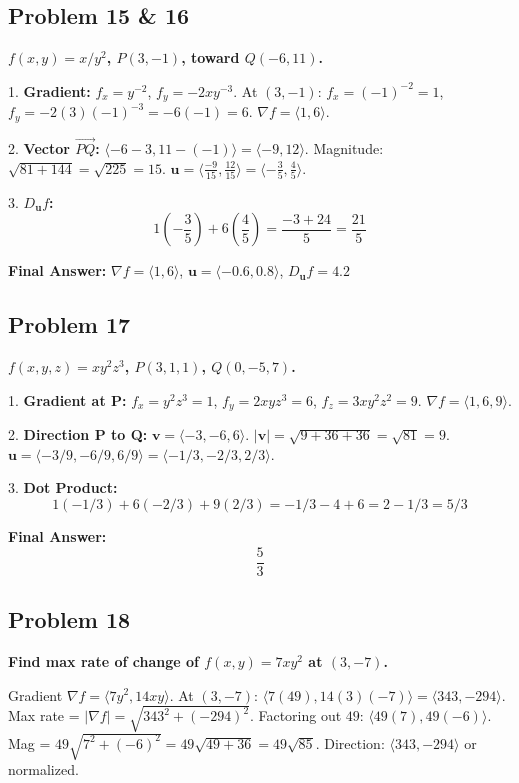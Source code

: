 \documentclass{article}
\begin{document}
\subsection*{Problem 15 \& 16}
\textbf{$f(x, y) = x/y^2$, $P(3, -1)$, toward $Q(-6, 11)$.}

1. \textbf{Gradient:} $f_x = y^{-2}$, $f_y = -2xy^{-3}$.
   At $(3, -1)$: $f_x = (-1)^{-2} = 1$, $f_y = -2(3)(-1)^{-3} = -6(-1) = 6$.
   $\nabla f = \langle 1, 6 \rangle$.

2. \textbf{Vector $\vec{PQ}$:} $\langle -6-3, 11-(-1) \rangle = \langle -9, 12 \rangle$.
   Magnitude: $\sqrt{81 + 144} = \sqrt{225} = 15$.
   $\mathbf{u} = \langle \frac{-9}{15}, \frac{12}{15} \rangle = \langle -\frac{3}{5}, \frac{4}{5} \rangle$.

3. \textbf{$D_{\mathbf{u}}f$:}
   \[ 1(-\frac{3}{5}) + 6(\frac{4}{5}) = \frac{-3+24}{5} = \frac{21}{5} \]

\textbf{Final Answer:}
$\nabla f = \langle 1, 6 \rangle$, $\mathbf{u} = \langle -0.6, 0.8 \rangle$, $D_{\mathbf{u}}f = \boxed{4.2}$

\hrulefill

\subsection*{Problem 17}
\textbf{$f(x, y, z) = xy^2z^3$, $P(3, 1, 1)$, $Q(0, -5, 7)$.}

1. \textbf{Gradient at P:}
   $f_x = y^2z^3 = 1$, $f_y = 2xyz^3 = 6$, $f_z = 3xy^2z^2 = 9$.
   $\nabla f = \langle 1, 6, 9 \rangle$.

2. \textbf{Direction P to Q:}
   $\mathbf{v} = \langle -3, -6, 6 \rangle$. $|\mathbf{v}| = \sqrt{9+36+36} = \sqrt{81} = 9$.
   $\mathbf{u} = \langle -3/9, -6/9, 6/9 \rangle = \langle -1/3, -2/3, 2/3 \rangle$.

3. \textbf{Dot Product:}
   \[ 1(-1/3) + 6(-2/3) + 9(2/3) = -1/3 - 4 + 6 = 2 - 1/3 = 5/3 \]

\textbf{Final Answer:}
\[ \boxed{\frac{5}{3}} \]

\hrulefill

\subsection*{Problem 18}
\textbf{Find max rate of change of $f(x, y) = 7xy^2$ at $(3, -7)$.}

Gradient $\nabla f = \langle 7y^2, 14xy \rangle$.
At $(3, -7)$: $\langle 7(49), 14(3)(-7) \rangle = \langle 343, -294 \rangle$.
Max rate = $|\nabla f| = \sqrt{343^2 + (-294)^2}$.
Factoring out $49$: $\langle 49(7), 49(-6) \rangle$.
Mag = $49\sqrt{7^2 + (-6)^2} = 49\sqrt{49+36} = 49\sqrt{85}$.
Direction: $\langle 343, -294 \rangle$ or normalized.
\end{document}
